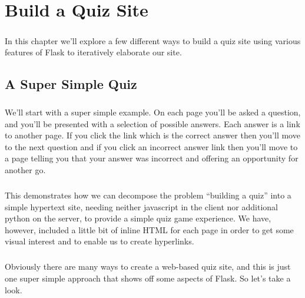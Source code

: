 \chapter{Build a Quiz Site}
\label{quiz}
\paragraph{} In this chapter we'll explore a few different ways to build a quiz site using various features of Flask to iteratively elaborate our site.


\section{A Super Simple Quiz}
\paragraph{} We'll start with a super simple example. On each page you'll be asked a question, and you'll be presented with a selection of possible answers. Each answer is a link to another page. If you click the link which is the correct answer then you'll move to the next question and if you click an incorrect answer link then you'll move to a page telling you that your answer was incorrect and offering an opportunity for another go.

\paragraph{} This demonstrates how we can decompose the problem ``building a quiz'' into a simple hypertext site, needing neither javascript in the client nor additional python on the server, to provide a simple quiz game experience. We have, however, included a little bit of inline HTML for each page in order to get some visual interest and to enable us to create hyperlinks.

\paragraph{} Obviously there are many ways to create a web-based quiz site, and this is just one super simple approach that shows off some aspects of Flask. So let's take a look.

